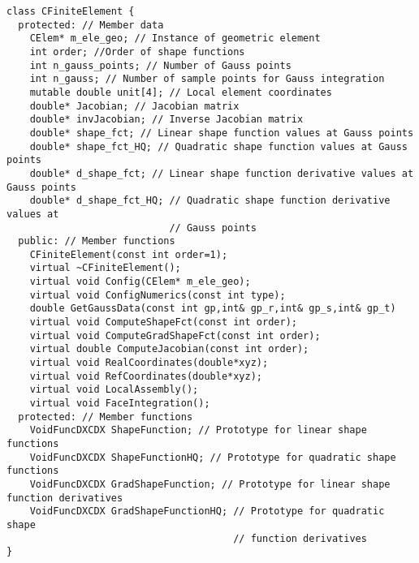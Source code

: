 \scriptsize
\begin{verbatim}
class CFiniteElement {
  protected: // Member data
    CElem* m_ele_geo; // Instance of geometric element
    int order; //Order of shape functions
    int n_gauss_points; // Number of Gauss points
    int n_gauss; // Number of sample points for Gauss integration
    mutable double unit[4]; // Local element coordinates
    double* Jacobian; // Jacobian matrix
    double* invJacobian; // Inverse Jacobian matrix
    double* shape_fct; // Linear shape function values at Gauss points
    double* shape_fct_HQ; // Quadratic shape function values at Gauss points
    double* d_shape_fct; // Linear shape function derivative values at Gauss points
    double* d_shape_fct_HQ; // Quadratic shape function derivative values at
                            // Gauss points
  public: // Member functions
    CFiniteElement(const int order=1);
    virtual ~CFiniteElement();
    virtual void Config(CElem* m_ele_geo);
    virtual void ConfigNumerics(const int type);
    double GetGaussData(const int gp,int& gp_r,int& gp_s,int& gp_t)
    virtual void ComputeShapeFct(const int order);
    virtual void ComputeGradShapeFct(const int order);
    virtual double ComputeJacobian(const int order);
    virtual void RealCoordinates(double*xyz);
    virtual void RefCoordinates(double*xyz);
    virtual void LocalAssembly();
    virtual void FaceIntegration();
  protected: // Member functions
    VoidFuncDXCDX ShapeFunction; // Prototype for linear shape functions
    VoidFuncDXCDX ShapeFunctionHQ; // Prototype for quadratic shape functions
    VoidFuncDXCDX GradShapeFunction; // Prototype for linear shape function derivatives
    VoidFuncDXCDX GradShapeFunctionHQ; // Prototype for quadratic shape 
                                       // function derivatives
}
\end{verbatim}
\normalfont\normalsize
